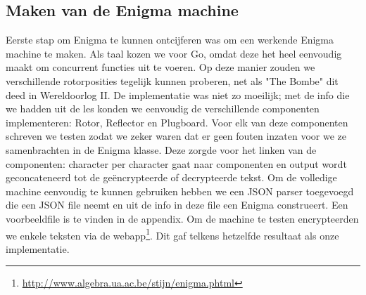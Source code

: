 \subsection{Maken van de Enigma machine}
Eerste stap om Enigma te kunnen ontcijferen was om een werkende Enigma machine te maken. Als taal kozen we voor Go, omdat deze het heel eenvoudig maakt om concurrent functies uit te voeren. Op deze manier zouden we verschillende rotorposities tegelijk kunnen proberen, net als "The Bombe" dit deed in Wereldoorlog II. De implementatie was niet zo moeilijk; met de info die we hadden uit de les konden we eenvoudig de verschillende componenten implementeren: Rotor, Reflector en Plugboard. Voor elk van deze componenten schreven we testen zodat we zeker waren dat er geen fouten inzaten voor we ze samenbrachten in de Enigma klasse. Deze zorgde voor het linken van de componenten: character per character gaat naar componenten en output wordt geconcateneerd tot de ge\"encrypteerde of decrypteerde tekst. Om de volledige machine eenvoudig te kunnen gebruiken hebben we een JSON parser toegevoegd die een JSON file neemt en uit de info in deze file een Enigma construeert. Een voorbeeldfile is te vinden in de appendix. Om de machine te testen encrypteerden we enkele teksten via de webapp\footnote{\url{http://www.algebra.ua.ac.be/stijn/enigma.phtml}}. Dit gaf telkens hetzelfde resultaat als onze implementatie.

